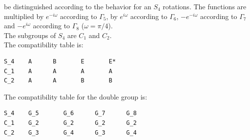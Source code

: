 \documentclass[12pt,a4paper]{article}
\begin{document}
be distinguished according to the behavior for an $S_4$ rotations.
The functions are multiplied by $e^{-i\omega}$ according to $\Gamma_5$,
by $e^{i\omega}$ according to $\Gamma_6$, $-e^{-i\omega}$ according to
$\Gamma_7$ and $-e^{i\omega}$ according to $\Gamma_8$ ($\omega=\pi/4$). \\
The subgroups of $S_4$ are $C_1$ and $C_2$. \\
The compatibility table is:
\begin{verbatim}
S_4    A      B       E       E*  
C_1    A      A       A       A
C_2    A      A       B       B
\end{verbatim}
The compatibility table for the double group is:
\begin{verbatim}
S_4    G_5       G_6      G_7      G_8 
C_1    G_2       G_2      G_2      G_2
C_2    G_3       G_4      G_3      G_4
\end{verbatim}

\newpage
\end{document}
